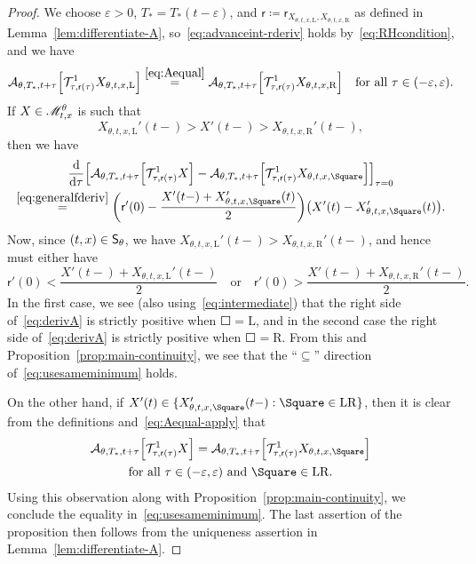 \documentclass[AHL,Unicode,longabstracts]{cedram}
\newcounter{setofcase}
\newcounter{case}[setofcase]
\newcommand*\ssS{\mathsf{S}}
\newcommand*\sfr{\mathsf{r}}
\newcommand*\scM{\mathscr{M}}
\newcommand{\clA}{\mathcal{A}}
\newcommand{\clT}{\mathcal{T}}
\newcommand*\st{\mathrel{:}}
\newcommand*\dif{\mathrm{d}}
\newcommand*\Left{\mathrm{L}}
\newcommand*\Right{\mathrm{R}}
\newcommand*\LR{\mathrm{LR}}
\newcommand*\eps{\varepsilon}
\let\oldin\in
\renewcommand{\in}{\mathchoice{\oldin}{\oldin}{\,\oldin\,}{\,\oldin\,}}
\let\originalleft\left
\let\originalright\right
\renewcommand{\left}{\mathopen{}\mathclose\bgroup\originalleft}
\renewcommand{\right}{\aftergroup\egroup\originalright}
\begin{document}
\begin{proof}
We choose $\eps>0$, $T_{*}=T_{*}(t-\eps)$, and $\sfr\coloneqq\sfr_{X_{\theta,t,x,\Left},X_{\theta,t,x,\Right}}$ as defined in Lemma~\ref{lem:differentiate-A}, so~\eqref{eq:advanceint-rderiv} holds by~\eqref{eq:RHcondition}, and we have
\begin{equation}\label{eq:Aequal-apply}
\clA_{\theta,T_{*},t+\tau}\left[\clT_{\tau,\sfr(\tau)}^{1}X_{\theta,t,x,\Left}\right]\overset{\eqref{eq:Aequal}}{=}\clA_{\theta,T_{*},t+\tau}\left[\clT_{\tau,\sfr(\tau)}^{1}X_{\theta,t,x,\Right}\right]\quad\text{for all }\tau\in(-\eps,\eps).
\end{equation}
If $X\in\scM_{t,x}^{\theta}$ is such that
\begin{equation}\label{eq:intermediate}
X_{\theta,t,x,\Left}'(t-)>X'(t-)>X_{\theta,t,x,\Right}'(t-),
\end{equation}
then we have
\begin{multline}\label{eq:derivA}
\frac{\dif}{\dif\tau}  \left[\clA_{\theta,T_{*},t+\tau}\left[\clT_{\tau,\sfr(\tau)}^{1}X\right]-\clA_{\theta,T_{*},t+\tau}\left[\clT_{\tau,\sfr(\tau)}^{1}X_{\theta,t,x,\Square}\right]\right]_{\tau=0}\\
\overset{\eqref{eq:generalfderiv}} = \left(\sfr'(0)-\frac{X'(t-)+X_{\theta,t,x,\Square}'(t)}{2}\right)\left(X'(t)-X_{\theta,t,x,\Square}'(t)\right).
\end{multline}
Now, since $(t,x)\in\ssS_{\theta}$, we have $X_{\theta,t,x,\Left}'(t-)>X_{\theta,t,x,\Right}'(t-)$, and hence must either have
\[
\sfr'(0)<\frac{X'(t-)+X_{\theta,t,x,\Left}'(t-)}{2}\quad\text{or}\quad\sfr'(0)>\frac{X'(t-)+X_{\theta,t,x,\Right}'(t-)}{2}.
\]
In the first case, we see (also using~\eqref{eq:intermediate}) that the right side of~\eqref{eq:derivA} is strictly positive when $\Square=\Left$, and in the second case the right side of~\eqref{eq:derivA} is strictly positive when $\Square=\Right$. From this and Proposition~\ref{prop:main-continuity}, we see that the ``$\subseteq$'' direction of~\eqref{eq:usesameminimum} holds.

On the other hand, if $X'(t)\in\{X_{\theta,t,x,\Square}'(t-)\st\Square\in\LR\}$, then it is clear from the definitions and~\eqref{eq:Aequal-apply} that
\begin{multline}\label{eq:sidessame}
\clA_{\theta,T_{*},t+\tau}\left[\clT_{\tau,\sfr(\tau)}^{1}X\right]
=\clA_{\theta,T_{*},t+\tau}\left[\clT_{\tau,\sfr(\tau)}^{1}X_{\theta,t,x,\Square}\right]\\
\text{for all }\tau\in(-\eps,\eps)\text{ and }\Square\in\LR.
\end{multline}
Using this observation along with Proposition~\ref{prop:main-continuity}, we conclude the equality in~\eqref{eq:usesameminimum}. The last assertion of the proposition then follows from the uniqueness assertion in Lemma~\ref{lem:differentiate-A}.
\end{proof}
\end{document}
